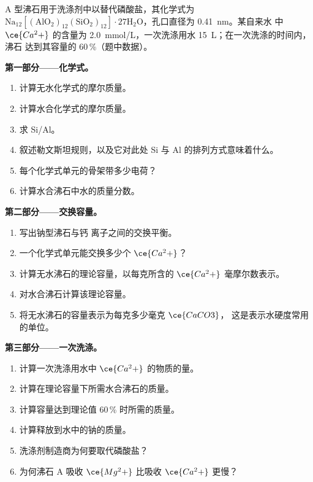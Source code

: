 \begin{problem}
\label{pb:b3:inorganic-materials:1}
A 型沸石用于洗涤剂中以替代磷酸盐，其化学式为
$\mathrm{Na_{12}[(AlO_2)_{12}(SiO_2)_{12}]\cdot 27H_2O}$，孔口直径为 \qty{0.41}{nm}。某自来水
中 $\ce{Ca^2+}$ 的含量为 \qty{2.0}{mmol/L}，一次洗涤用水 \qty{15}{L}；在一次洗涤的时间内，沸石
达到其容量的 60\,\%（题中数据）。

\medskip\noindent\textbf{第一部分——化学式。}
\begin{enumerate}
  \item 计算无水化学式的摩尔质量。
  \item 计算水合化学式的摩尔质量。
  \item 求 Si/Al。
  \item 叙述勒文斯坦规则，以及它对此处
        Si 与 Al 的排列方式意味着什么。
  \item 每个化学式单元的骨架带多少电荷？
  \item 计算水合沸石中水的质量分数。
\end{enumerate}

\medskip\noindent\textbf{第二部分——交换容量。}
\begin{enumerate}[resume]
  \item 写出钠型沸石与钙
        离子之间的交换平衡。
  \item 一个化学式单元能交换多少个 $\ce{Ca^2+}$？
  \item 计算无水沸石的理论容量，以每克所含的 $\ce{Ca^2+}$
        毫摩尔数表示。
  \item 对水合沸石计算该理论容量。
  \item 将无水沸石的容量表示为每克多少毫克 $\ce{CaCO3}$，
        这是表示水硬度常用的单位。
\end{enumerate}

\medskip\noindent\textbf{第三部分——一次洗涤。}
\begin{enumerate}[resume]
  \item 计算一次洗涤用水中 $\ce{Ca^2+}$ 的物质的量。
  \item 计算在理论容量下所需水合沸石的质量。
  \item 计算容量达到理论值 60\,\% 时所需的质量。
  \item 计算释放到水中的钠的质量。
  \item 洗涤剂制造商为何要取代磷酸盐？
  \item 为何沸石 A 吸收 $\ce{Mg^2+}$ 比吸收 $\ce{Ca^2+}$ 更慢？
\end{enumerate}


\end{problem}
